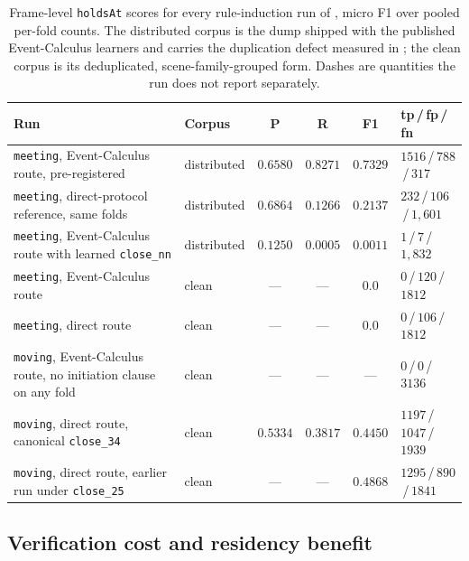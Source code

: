 \begin{table}[htbp]
  \centering
  \caption{Frame-level \texttt{holdsAt} scores for every rule-induction run of , micro F1 over pooled per-fold counts. The distributed corpus is the dump shipped with the published Event-Calculus learners and carries the duplication defect measured in ; the clean corpus is its deduplicated, scene-family-grouped form. Dashes are quantities the run does not report separately.}
  \label{tab:ec-runs}
  \small
  \begin{tabularx}{\linewidth}{@{}L l c c c l@{}}
    \toprule
    \textbf{Run} & \textbf{Corpus} & \textbf{P} & \textbf{R} & \textbf{F1} & \textbf{tp\,/\,fp\,/\,fn} \\
    \midrule
    \texttt{meeting}, Event-Calculus route, pre-registered      & distributed & $0.6580$ & $0.8271$ & $0.7329$ & $1516$\,/\,$788$\,/\,$317$ \\
    \texttt{meeting}, direct-protocol reference, same folds     & distributed & $0.6864$ & $0.1266$ & $0.2137$ & $232$\,/\,$106$\,/\,$1{,}601$ \\
    \texttt{meeting}, Event-Calculus route with learned \texttt{close\_nn} & distributed & $0.1250$ & $0.0005$ & $0.0011$ & $1$\,/\,$7$\,/\,$1{,}832$ \\
    \addlinespace
    \texttt{meeting}, Event-Calculus route                      & clean & --- & --- & $0.0$ & $0$\,/\,$120$\,/\,$1812$ \\
    \texttt{meeting}, direct route                              & clean & --- & --- & $0.0$ & $0$\,/\,$106$\,/\,$1812$ \\
    \texttt{moving}, Event-Calculus route, no initiation clause on any fold & clean & --- & --- & --- & $0$\,/\,$0$\,/\,$3136$ \\
    \texttt{moving}, direct route, canonical \texttt{close\_34} & clean & $0.5334$ & $0.3817$ & $0.4450$ & $1197$\,/\,$1047$\,/\,$1939$ \\
    \texttt{moving}, direct route, earlier run under \texttt{close\_25} & clean & --- & --- & $0.4868$ & $1295$\,/\,$890$\,/\,$1841$ \\
    \bottomrule
  \end{tabularx}
\end{table}

\subsection{Verification cost and residency benefit}\label{sec:overhead}

